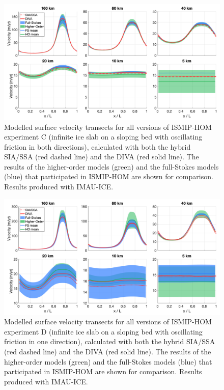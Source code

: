 \documentclass{article}
\begin{document}
\begin{figure}[H]
  \includegraphics[width=0.95\linewidth]{Fig_benchmark_ISMIP_HOM_C.png}
  \caption{Modelled surface velocity transects for all versions of ISMIP-HOM experiment C (infinite ice slab on a sloping bed with oscillating friction in both directions), calculated with both the hybrid SIA/SSA (red dashed line) and the DIVA (red solid line). The results of the higher-order models (green) and the full-Stokes models (blue) that participated in ISMIP-HOM are shown for comparison. Results produced with IMAU-ICE.}
\end{figure}

\begin{figure}[H]
  \includegraphics[width=0.95\linewidth]{Fig_benchmark_ISMIP_HOM_D.png}
  \caption{Modelled surface velocity transects for all versions of ISMIP-HOM experiment D (infinite ice slab on a sloping bed with oscillating friction in one direction), calculated with both the hybrid SIA/SSA (red dashed line) and the DIVA (red solid line). The results of the higher-order models (green) and the full-Stokes models (blue) that participated in ISMIP-HOM are shown for comparison. Results produced with IMAU-ICE.}
\end{figure}
\end{document}
